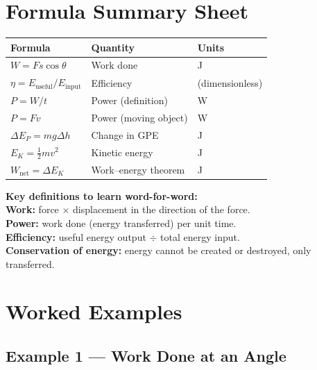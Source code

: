\section{Formula Summary Sheet}

\begin{minipage}{\linewidth}
\begin{tcolorbox}[colback=lightgold, colframe=accentgold]
\renewcommand{\arraystretch}{1.8}
\begin{tabular}{@{}lll@{}}
\toprule
\textbf{Formula} & \textbf{Quantity} & \textbf{Units} \\
\midrule
$W = Fs\cos\theta$ & Work done & J \\
$\eta = E_{\text{useful}} / E_{\text{input}}$ & Efficiency & (dimensionless) \\
$P = W/t$ & Power (definition) & W \\
$P = Fv$ & Power (moving object) & W \\
$\Delta E_P = mg\Delta h$ & Change in GPE & J \\
$E_K = \tfrac{1}{2}mv^2$ & Kinetic energy & J \\
$W_{\text{net}} = \Delta E_K$ & Work--energy theorem & J \\
\bottomrule
\end{tabular}
\end{tcolorbox}

\vspace{0.5em}
\begin{tcolorbox}[colback=lightblue, colframe=darkblue]
\textbf{Key definitions to learn word-for-word:}\\[0.3em]
\textbf{Work:} force $\times$ displacement in the direction of the force.\\[0.2em]
\textbf{Power:} work done (energy transferred) per unit time.\\[0.2em]
\textbf{Efficiency:} useful energy output $\div$ total energy input.\\[0.2em]
\textbf{Conservation of energy:} energy cannot be created or destroyed, only transferred.
\end{tcolorbox}
\end{minipage}

\section{Worked Examples}

\subsection*{Example 1 — Work Done at an Angle}

